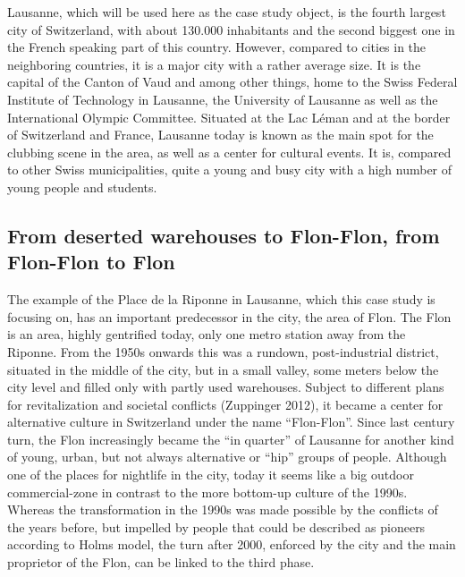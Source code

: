\documentclass[a4paper,
fontsize=11pt,
oneside,
numbers=noperiodatend,
parskip=half-,
bibliography=totoc,
final
]{scrartcl}
\begin{document}
Lausanne, which will be used here as the case study object, is the
fourth largest city of Switzerland, with about 130.000 inhabitants and
the second biggest one in the French speaking part of this country.
However, compared to cities in the neighboring countries, it is a major
city with a rather average size. It is the capital of the Canton of Vaud
and among other things, home to the Swiss Federal Institute of
Technology in Lausanne, the University of Lausanne as well as the
International Olympic Committee. Situated at the Lac Léman and at the
border of Switzerland and France, Lausanne today is known as the main
spot for the clubbing scene in the area, as well as a center for
cultural events. It is, compared to other Swiss municipalities, quite a
young and busy city with a high number of young people and students.

\subsection{From deserted warehouses to Flon-Flon, from Flon-Flon to
Flon}\label{from-deserted-warehouses-to-flon-flon-from-flon-flon-to-flon}

The example of the Place de la Riponne in Lausanne, which this case
study is focusing on, has an important predecessor in the city, the area
of Flon. The Flon is an area, highly gentrified today, only one metro
station away from the Riponne. From the 1950s onwards this was a
rundown, post-industrial district, situated in the middle of the city,
but in a small valley, some meters below the city level and filled only
with partly used warehouses. Subject to different plans for
revitalization and societal conflicts (Zuppinger 2012), it became a
center for alternative culture in Switzerland under the name
\enquote{Flon-Flon}. Since last century turn, the Flon increasingly
became the \enquote{in quarter} of Lausanne for another kind of young,
urban, but not always alternative or \enquote{hip} groups of people.
Although one of the places for nightlife in the city, today it seems
like a big outdoor commercial-zone in contrast to the more bottom-up
culture of the 1990s. Whereas the transformation in the 1990s was made
possible by the conflicts of the years before, but impelled by people
that could be described as pioneers according to Holms model, the turn
after 2000, enforced by the city and the main proprietor of the Flon,
can be linked to the third phase.
\end{document}
